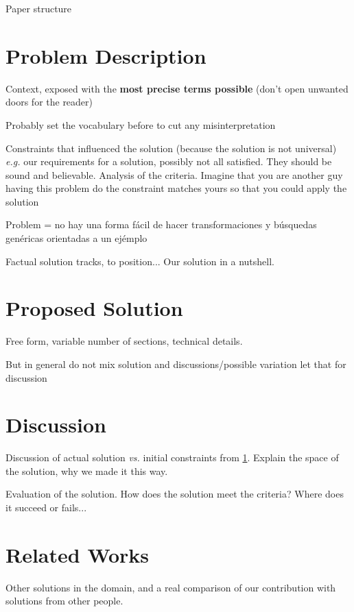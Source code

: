 \documentclass{article}
\begin{document}
Paper structure




\section{Problem Description}
\label{sec:problem}

Context, exposed with the \textbf{most precise terms possible} (don't open
unwanted doors for the reader)


Probably set the vocabulary before to cut any misinterpretation

Constraints that influenced the solution (because the solution is not
universal) \emph{e.g.} our requirements for a solution, possibly not all
satisfied. They should be sound and believable. Analysis of the criteria.
Imagine that you are another guy having this problem do the constraint
matches yours so that you could apply the solution

Problem = no hay una forma fácil de hacer transformaciones y búsquedas genéricas orientadas a un ejémplo

Factual solution tracks, to position...
Our solution in a nutshell.


\section{Proposed Solution}
\label{sec:contribution}

Free form, variable number of sections, technical details.

But in general do not mix solution and discussions/possible variation
let that for discussion

\section{Discussion}
\label{sec:discussion}

Discussion of actual solution \emph{vs.} initial constraints from
\ref{sec:problem}. Explain the space of the solution, why we made it this way.

Evaluation of the solution. How does the solution meet the criteria? Where
does it succeed or fails...


\section{Related Works}
\label{sec:related}

Other solutions in the domain, and a real comparison of our contribution with
solutions from other people.
\end{document}
